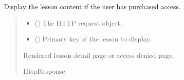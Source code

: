 \documentclass[letterpaper,10pt,english]{sphinxmanual}
\begin{document}
\begin{fulllineitems}
\label{\detokenize{courses:courses.views.lesson_detail}}
\pysigstartsignatures
\pysiglinewithargsret
{}
{\sphinxparamcomma {}}
{}
\pysigstopsignatures
\sphinxAtStartPar
Display the lesson content if the user has purchased access.
\begin{quote}\begin{description}
\begin{itemize}
\item {} 
\sphinxAtStartPar
{} () \textendash{} The HTTP request object.

\item {} 
\sphinxAtStartPar
{} () \textendash{} Primary key of the lesson to display.

\end{itemize}

\sphinxAtStartPar
Rendered lesson detail page or access denied page.

\sphinxAtStartPar
HttpResponse

\end{description}\end{quote}

\end{fulllineitems}

\end{document}
